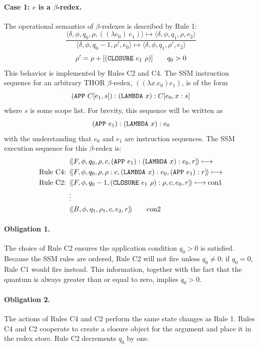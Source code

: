 \paragraph{Case 1: \(e\) is a \(\beta\)-redex.}
The operational semantics of \(\beta\)-redexes is described by Rule 1:
\[
\frac{
  \langle \delta,\phi,q_0,\rho,((\lambda e_0)\ e_1)\rangle
  \longmapsto
  \langle \delta,\phi,q_1,\rho,e_2\rangle
}{
  \langle \delta,\phi,q_0-1,\rho',e_0\rangle
  \longmapsto
  \langle \delta,\phi,q_1,\rho',e_2\rangle
}
\]
\[
\rho'=\rho+[(\texttt{CLOSURE}\ e_1\ \rho)]
\qquad
q_0>0
\]
This behavior is implemented by Rules C2 and C4. The SSM instruction sequence
for an arbitrary THOR \(\beta\)-redex, \(((\lambda x.e_0)e_1)\), is of the form
\[
(\THOR{APP}\ C[e_1,s]):(\THOR{LAMBDA}\ x):C[e_0,x:s]
\]
where \(s\) is some scope list. For brevity, this sequence will be written as
\[
(\texttt{APP}\ e_1):(\texttt{LAMBDA}\ x):e_0
\]
with the understanding that \(e_0\) and \(e_1\) are instruction sequences. The
SSM execution sequence for this \(\beta\)-redex is:
\begin{align*}
&\langle\!\langle F,\phi,q_0,\rho,c,(\THOR{APP}\ e_1):(\THOR{LAMBDA}\ x):e_0,r\rangle\!\rangle
\longmapsto\\
\text{Rule C4: }&
\langle\!\langle F,\phi,q_0,\rho,\rho:c,(\THOR{LAMBDA}\ x):e_0,(\THOR{APP}\ e_1):r\rangle\!\rangle
\longmapsto\\
\text{Rule C2: }&
\langle\!\langle F,\phi,q_0-1,(\THOR{CLOSURE}\ e_1\ \rho):\rho,c,e_0,r\rangle\!\rangle
\longmapsto \mathrm{con1}\\
&\vdots\\
&\langle\!\langle B,\phi,q_1,\rho_1,c,e_2,r\rangle\!\rangle
\qquad \mathrm{con2}
\end{align*}

\paragraph{Obligation 1.} The choice of Rule C2 ensures the application
condition \(q_0>0\) is satisfied. Because the SSM rules are ordered, Rule C2
will not fire unless \(q_0\ne 0\); if \(q_0=0\), Rule C1 would fire instead.
This information, together with the fact that the quantum is always greater
than or equal to zero, implies \(q_0>0\).

\paragraph{Obligation 2.} The actions of Rules C4 and C2 perform the same state
changes as Rule 1. Rules C4 and C2 cooperate to create a closure object for the
argument and place it in the redex store. Rule C2 decrements \(q_0\) by one.

